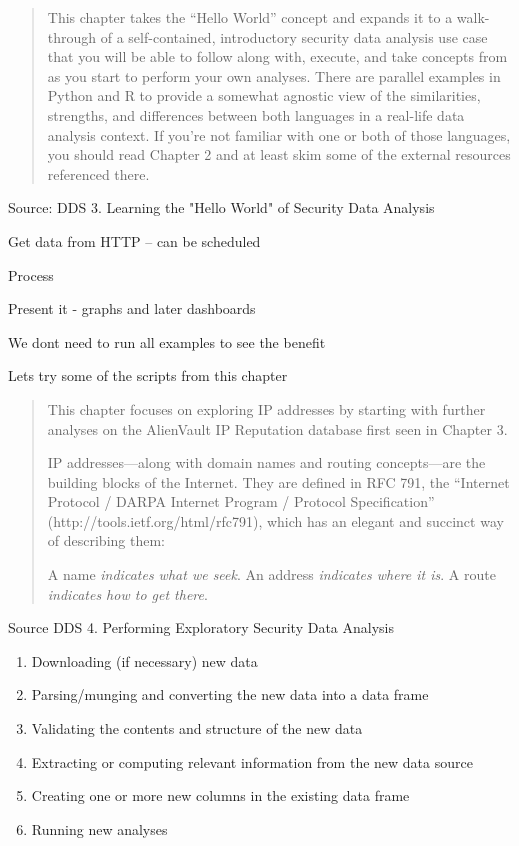 \documentclass[Screen16to9,17pt]{foils}
\begin{document}


\begin{quote}
This chapter takes the “Hello World” concept and expands it to a walk-through of a self-contained, introductory security data analysis use case that you will be able to follow along with, execute, and take concepts from as you start to perform your own analyses. There are parallel examples in Python and R to provide a somewhat agnostic view of the similarities, strengths, and differences between both languages in a real-life data analysis context. If you’re not familiar with one or both of those languages, you should read Chapter 2 and at least skim some of the external resources referenced there.
\end{quote}
Source: DDS 3. Learning the "Hello World" of Security Data Analysis


\begin{list2}
\item Get data from HTTP -- can be scheduled
\item Process
\item Present it - graphs and later dashboards
\item We dont need to run all examples to see the benefit
\item Lets try some of the scripts from this chapter
\end{list2}




\begin{quote}
This chapter focuses on exploring IP addresses by starting with further analyses on the AlienVault IP Reputation database first seen in Chapter 3.

IP addresses—along with domain names and routing concepts—are the building blocks of the Internet. They are defined in RFC 791, the “Internet Protocol / DARPA Internet Program / Protocol Specification” (http://tools.ietf.org/html/rfc791), which has an elegant and succinct way of describing them:

\hskip 1cm A name \emph{indicates what we seek}. An address \emph{indicates where it is}. A route \emph{indicates how to get there}.

\end{quote}
Source DDS 4. Performing Exploratory Security Data Analysis

{\small
\begin{enumerate}
\item Downloading (if necessary) new data
\item  Parsing/munging and converting the new data into a data frame
\item  Validating the contents and structure of the new data
\item  Extracting or computing relevant information from the new data source
\item  Creating one or more new columns in the existing data frame
\item  Running new analyses
\end{enumerate}
}
\end{document}
